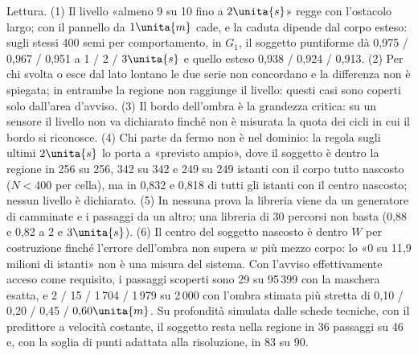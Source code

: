 Lettura. (1) Il livello «almeno 9 su 10 fino a $2\unita{s}$» regge con l'ostacolo largo; con il pannello da $1\unita{m}$ cade, e la caduta dipende dal corpo esteso: sugli stessi 400 semi per comportamento, in $G_1$, il soggetto puntiforme dà 0,975 / 0,967 / 0,951 a 1 / 2 / $3\unita{s}$ e quello esteso 0,938 / 0,924 / 0,913. (2) Per chi svolta o esce dal lato lontano le due serie non concordano e la differenza non è spiegata; in entrambe la regione non raggiunge il livello: questi casi sono coperti solo dall'area d'avviso. (3) Il bordo dell'ombra è la grandezza critica: su un sensore il livello non va dichiarato finché non è misurata la quota dei cicli in cui il bordo si riconosce. (4) Chi parte da fermo non è nel dominio: la regola sugli ultimi $2\unita{s}$ lo porta a «previsto ampio», dove il soggetto è dentro la regione in 256 su 256, 342 su 342 e 249 su 249 istanti con il corpo tutto nascosto ($N<400$ per cella), ma in 0,832 e 0,818 di tutti gli istanti con il centro nascosto; nessun livello è dichiarato. (5) In nessuna prova la libreria viene da un generatore di camminate e i passaggi da un altro; una libreria di 30 percorsi non basta (0,88 e 0,82 a 2 e $3\unita{s}$). (6) Il centro del soggetto nascosto è dentro $W$ per costruzione finché l'errore dell'ombra non supera $w$ più mezzo corpo: lo «0 su 11,9 milioni di istanti» non è una misura del sistema. Con l'avviso effettivamente acceso come requisito, i passaggi scoperti sono 29 su 95\,399 con la maschera esatta, e 2 / 15 / 1\,704 / 1\,979 su 2\,000 con l'ombra stimata più stretta di 0,10 / 0,20 / 0,45 / $0{,}60\unita{m}$. Su profondità simulata dalle schede tecniche, con il predittore a velocità costante, il soggetto resta nella regione in 36 passaggi su 46 e, con la soglia di punti adattata alla risoluzione, in 83 su 90.


